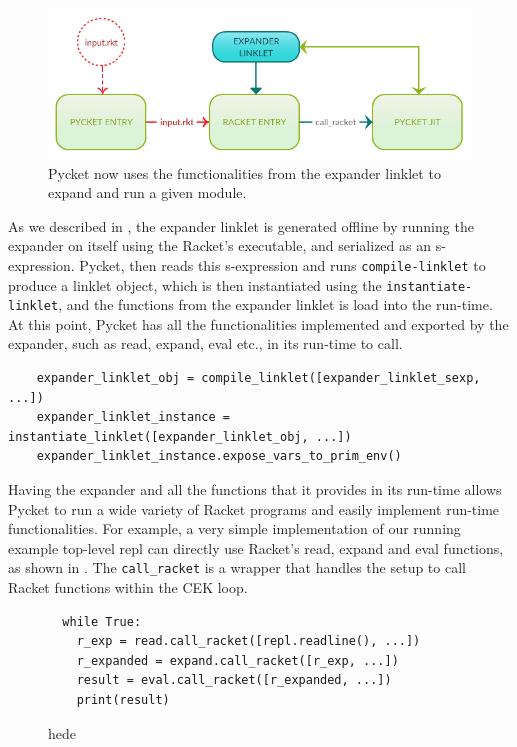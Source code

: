 \begin{figure}[h!]
  \centering
\includegraphics[scale=0.3]{img/new-pycket}
\caption{Pycket now uses the functionalities from the expander linklet to expand and run a given module.}
\label{fig:new-pycket}
\end{figure}

As we described in , the expander linklet
is generated offline by running the expander on itself using the
Racket's executable, and serialized as an s-expression. Pycket, then
reads this s-expression and runs \verb|compile-linklet| to produce a
linklet object, which is then instantiated using the
\verb|instantiate-linklet|, and the functions from the expander
linklet is load into the run-time. At this point, Pycket has all the
functionalities implemented and exported by the expander, such as
read, expand, eval etc., in its run-time to call.

\begin{verbatim}
    expander_linklet_obj = compile_linklet([expander_linklet_sexp, ...])
    expander_linklet_instance = instantiate_linklet([expander_linklet_obj, ...])
    expander_linklet_instance.expose_vars_to_prim_env()
\end{verbatim}

Having the expander and all the functions that it provides in its
run-time allows Pycket to run a wide variety of Racket programs and
easily implement run-time functionalities. For example, a very simple
implementation of our running example top-level repl can directly use
Racket's read, expand and eval functions, as shown in
. The \verb|call_racket| is a wrapper that
handles the setup to call Racket functions within the CEK loop.

\begin{figure}
  \vspace{-0.6cm}
\begin{verbatim}
  while True:
    r_exp = read.call_racket([repl.readline(), ...])
    r_expanded = expand.call_racket([r_exp, ...])
    result = eval.call_racket([r_expanded, ...])
    print(result)
\end{verbatim}
\caption{hede}
\label{fig:repl-rpython}
\end{figure}

